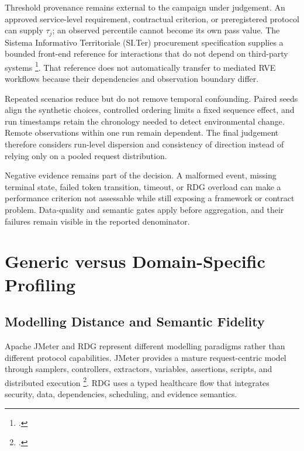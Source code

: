 \noindent Threshold provenance remains external to the campaign under judgement. An
approved service-level requirement, contractual criterion, or preregistered
protocol can supply $\tau_j$; an observed percentile cannot become its own pass
value. The Sistema Informativo Territoriale (SI.Ter) procurement specification
supplies a bounded front-end
reference for interactions that do not depend on third-party systems
\footcite[pp.~56--57]{azienda-zero-siter-capitolato}. That reference does not
automatically transfer to mediated RVE workflows because their dependencies and
observation boundary differ.

\noindent Repeated scenarios reduce but do not remove temporal confounding. Paired seeds
align the synthetic choices, controlled ordering limits a fixed sequence effect,
and run timestamps retain the chronology needed to detect environmental change.
Remote observations within one run remain dependent. The final judgement
therefore considers run-level dispersion and consistency of direction instead of
relying only on a pooled request distribution.

\noindent Negative evidence remains part of the decision. A malformed event, missing
terminal state, failed token transition, timeout, or RDG overload can make a
performance criterion not assessable while still exposing a framework or
contract problem. Data-quality and semantic gates apply before aggregation, and
their failures remain visible in the reported denominator.

\section{Generic versus Domain-Specific Profiling}
\subsection{Modelling Distance and Semantic Fidelity}

\noindent Apache JMeter and RDG represent
different modelling paradigms rather than different protocol capabilities.
JMeter provides a mature request-centric model through samplers, controllers,
extractors, variables, assertions, scripts, and distributed execution
\footcite{apache-jmeter-test-plan,apache-jmeter-component-reference,apache-jmeter-functions-variables,apache-jmeter-remote-testing}.
RDG uses a typed healthcare flow that integrates security, data, dependencies,
scheduling, and evidence semantics.

